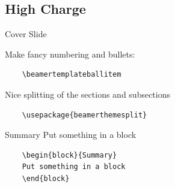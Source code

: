 \documentclass[professionalfonts,t]{beamer}
\begin{document}
\subsection{High Charge}
\begin{frame}[containsverbatim]{Cover Slide}


\end{frame}
\begin{frame}[containsverbatim]

Make fancy numbering and bullets:
\begin{verbatim}
    \beamertemplateballitem
\end{verbatim}

\smallskip

Nice splitting of the sections and subsections \begin{verbatim}
    \usepackage{beamerthemesplit}
\end{verbatim}

\begin{block}{Summary}
Put something in a block
\end{block}

\begin{verbatim}
    \begin{block}{Summary}
    Put something in a block
    \end{block}
\end{verbatim}

\end{frame}
\end{document}
